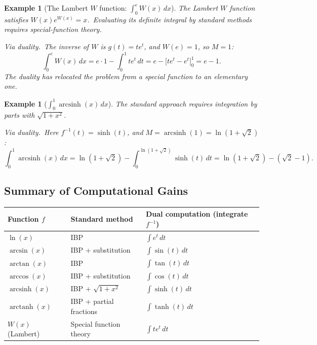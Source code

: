 \documentclass[11pt,a4paper]{article}
\newtheorem{example}[theorem]{Example}
\begin{document}
\begin{example}[The Lambert $W$ function: $\int_0^e W(x)\,dx$]\label{ex:lambert}
The Lambert $W$ function satisfies $W(x)e^{W(x)}=x$.\ Evaluating its definite integral by standard methods requires special-function theory.

\emph{Via duality.}\ The inverse of $W$ is $g(t)=te^t$, and $W(e)=1$, so $M=1$:
\[
\int_0^e W(x)\,dx = e\cdot 1 - \int_0^1 te^t\,dt = e - \bigl[te^t - e^t\bigr]_0^1 = e-1.
\]
The duality has relocated the problem from a special function to an elementary one.
\end{example}

\begin{example}[$\int_0^1\operatorname{arcsinh}(x)\,dx$]\label{ex:arcsinh}
The standard approach requires integration by parts with $\sqrt{1+x^2}$.

\emph{Via duality.}\ Here $f^{-1}(t)=\sinh(t)$, and $M=\operatorname{arcsinh}(1)=\ln(1+\sqrt{2})$:
\[
\int_0^1\operatorname{arcsinh}(x)\,dx = \ln(1+\sqrt{2}) - \int_0^{\ln(1+\sqrt{2})}\sinh(t)\,dt = \ln(1+\sqrt{2}) - (\sqrt{2}-1).
\]
\end{example}

\subsection{Summary of Computational Gains}

\begin{center}
\begin{tabular}{l l l}
\textbf{Function $f$} & \textbf{Standard method} & \textbf{Dual computation (integrate $f^{-1}$)} \\
\hline
$\ln(x)$              & IBP                       & $\int e^t\,dt$ \\
$\arcsin(x)$          & IBP + substitution         & $\int\sin(t)\,dt$ \\
$\arctan(x)$          & IBP                       & $\int\tan(t)\,dt$ \\
$\arccos(x)$          & IBP + substitution         & $\int\cos(t)\,dt$ \\
$\operatorname{arcsinh}(x)$ & IBP + $\sqrt{1+x^2}$ & $\int\sinh(t)\,dt$ \\
$\operatorname{arctanh}(x)$ & IBP + partial fractions & $\int\tanh(t)\,dt$ \\
$W(x)$ (Lambert)      & Special function theory    & $\int te^t\,dt$ \\
\end{tabular}
\end{center}
\end{document}
